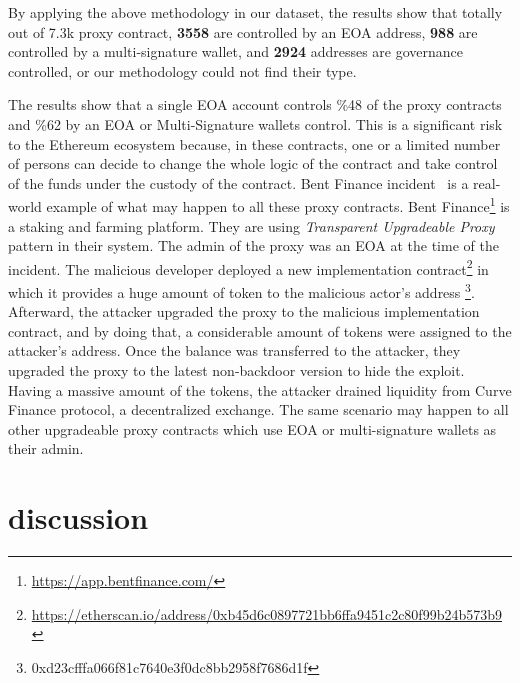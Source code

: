 By applying the above methodology in our dataset, the results show that totally out of 7.3k proxy contract, \textbf{3558} are controlled by an EOA address, \textbf{988} are controlled by a multi-signature wallet, and \textbf{2924} addresses are governance controlled, or our methodology could not find their type.

The results show that a single EOA account controls \%48 of the proxy contracts and \%62 by an EOA or Multi-Signature wallets control. This is a significant risk to the Ethereum ecosystem because, in these contracts, one or a limited number of persons can decide to change the whole logic of the contract and take control of the funds under the custody of the contract.
Bent Finance incident~\cite{bentFinanceHack} is a real-world example of what may happen to all these proxy contracts. Bent Finance\footnote{\url{https://app.bentfinance.com/}} is a staking and farming platform. They are using \textit{Transparent Upgradeable Proxy} pattern in their system. The admin of the proxy was an EOA at the time of the incident. The malicious developer deployed a new implementation contract\footnote{\url{https://etherscan.io/address/0xb45d6c0897721bb6ffa9451c2c80f99b24b573b9}} in which it provides a huge amount of token to the malicious actor's address \footnote{0xd23cfffa066f81c7640e3f0dc8bb2958f7686d1f}. 
Afterward, the attacker upgraded the proxy to the malicious implementation contract, and by doing that, a considerable amount of tokens were assigned to the attacker's address. Once the balance was transferred to the attacker, they upgraded the proxy to the latest non-backdoor version to hide the exploit. 
Having a massive amount of the tokens, the attacker drained liquidity from Curve Finance protocol, a decentralized exchange.
The same scenario may happen to all other upgradeable proxy contracts which use EOA or multi-signature wallets as their admin.







\section{discussion}


